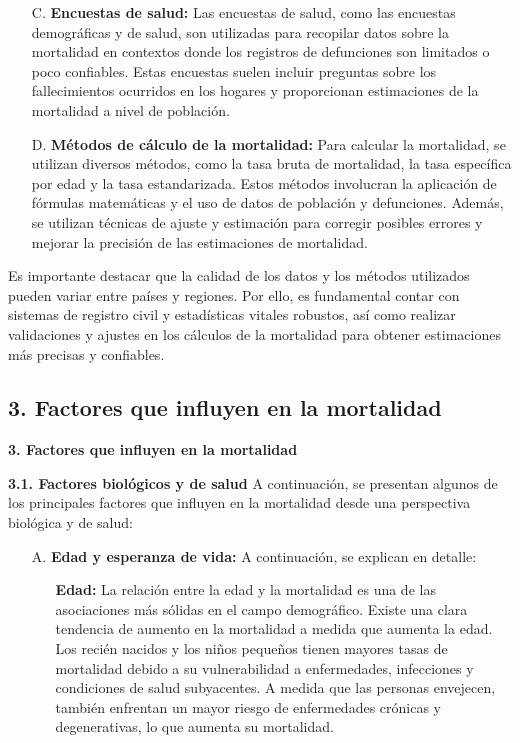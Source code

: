 \documentclass[8pt,a4paper]{beamer}
\begin{document}
{\begin{frame}{}
\begin{block}{}
\setlength{\parskip}{3px}
\justifying
\begin{enumerate}
\setlength{\parskip}{3px}
\justifying
\item[C.] \textbf{Encuestas de salud:} Las encuestas de salud, como las encuestas demográficas y de salud, son utilizadas para recopilar datos sobre la mortalidad en contextos donde los registros de defunciones son limitados o poco confiables. Estas encuestas suelen incluir preguntas sobre los fallecimientos ocurridos en los hogares y proporcionan estimaciones de la mortalidad a nivel de población.

\item[D.] \textbf{Métodos de cálculo de la mortalidad:} Para calcular la mortalidad, se utilizan diversos métodos, como la tasa bruta de mortalidad, la tasa específica por edad y la tasa estandarizada. Estos métodos involucran la aplicación de fórmulas matemáticas y el uso de datos de población y defunciones. Además, se utilizan técnicas de ajuste y estimación para corregir posibles errores y mejorar la precisión de las estimaciones de mortalidad.
\end{enumerate}
Es importante destacar que la calidad de los datos y los métodos utilizados pueden variar entre países y regiones. Por ello, es fundamental contar con sistemas de registro civil y estadísticas vitales robustos, así como realizar validaciones y ajustes en los cálculos de la mortalidad para obtener estimaciones más precisas y confiables.
\end{block}
\end{frame}


\subsection{3. Factores que influyen en la mortalidad}
\begin{frame}{\textbf{3. Factores que influyen en la mortalidad}}
\setlength{\parskip}{3px}
\justifying
\begin{block}{\textbf{3.1. Factores biológicos y de salud}}
\setlength{\parskip}{3px}
\justifying
A continuación, se presentan algunos de los principales factores que influyen en la mortalidad desde una perspectiva biológica y de salud:
\begin{enumerate}
\setlength{\parskip}{3px}
\justifying
\item[A.] \textbf{Edad y esperanza de vida:}  A continuación, se explican en detalle:
\begin{enumerate}
\setlength{\parskip}{3px}
\justifying
\item[\ding{99}] \textbf{Edad:} La relación entre la edad y la mortalidad es una de las asociaciones más sólidas en el campo demográfico. Existe una clara tendencia de aumento en la mortalidad a medida que aumenta la edad. Los recién nacidos y los niños pequeños tienen mayores tasas de mortalidad debido a su vulnerabilidad a enfermedades, infecciones y condiciones de salud subyacentes. A medida que las personas envejecen, también enfrentan un mayor riesgo de enfermedades crónicas y degenerativas, lo que aumenta su mortalidad.


\end{enumerate}
\end{enumerate}
\end{block}
\end{frame}}
\end{document}
